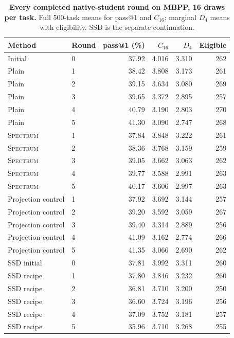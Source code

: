 \documentclass{article}
\newcommand{\method}{\textsc{Spectrum}}
\begin{document}
\begin{table}[t]
\centering\small
\caption{\textbf{Every completed native-student round on MBPP, 16 draws per task.} Full 500-task means for pass@1 and $C_{16}$; marginal $D_4$ means with eligibility. SSD is the separate continuation.}
\label{tab:rounds}
\begin{tabular}{llrrrr}
\toprule
Method & Round & pass@1 (\%) & $C_{16}$ & $D_4$ & Eligible\\
\midrule
Initial & 0 & 37.92 & 4.016 & 3.310 & 262\\
\midrule
Plain & 1 & 38.42 & 3.808 & 3.173 & 261\\
Plain & 2 & 39.15 & 3.634 & 3.080 & 269\\
Plain & 3 & 39.65 & 3.372 & 2.895 & 257\\
Plain & 4 & 40.79 & 3.190 & 2.803 & 270\\
Plain & 5 & 41.30 & 3.090 & 2.747 & 268\\
\midrule
\method & 1 & 37.84 & 3.848 & 3.222 & 261\\
\method & 2 & 38.36 & 3.768 & 3.159 & 259\\
\method & 3 & 39.05 & 3.662 & 3.063 & 262\\
\method & 4 & 39.77 & 3.588 & 2.991 & 263\\
\method & 5 & 40.17 & 3.606 & 2.997 & 263\\
\midrule
Projection control & 1 & 37.92 & 3.692 & 3.144 & 257\\
Projection control & 2 & 39.20 & 3.592 & 3.059 & 267\\
Projection control & 3 & 39.40 & 3.314 & 2.889 & 256\\
Projection control & 4 & 41.09 & 3.162 & 2.774 & 266\\
Projection control & 5 & 41.35 & 3.066 & 2.690 & 262\\
\midrule
SSD initial & 0 & 37.81 & 3.992 & 3.311 & 260\\
SSD recipe & 1 & 37.80 & 3.846 & 3.232 & 260\\
SSD recipe & 2 & 36.81 & 3.710 & 3.200 & 250\\
SSD recipe & 3 & 36.60 & 3.724 & 3.196 & 256\\
SSD recipe & 4 & 37.09 & 3.752 & 3.181 & 257\\
SSD recipe & 5 & 35.96 & 3.710 & 3.268 & 255\\\bottomrule\end{tabular}\end{table}
\end{document}
